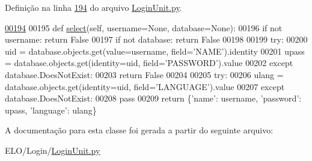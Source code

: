 Definição na linha \hyperlink{LoginUnit_8py_source_l00194}{194} do arquivo \hyperlink{LoginUnit_8py_source}{Login\-Unit.\-py}.


\begin{DoxyCode}
\hypertarget{classLogin_1_1LoginUnit_1_1PersLogin_l00194}{}\hyperlink{classLogin_1_1LoginUnit_1_1PersLogin_a1847dbd744377283add2327d2eb0b99f}{00194} 
00195     \textcolor{keyword}{def }\hyperlink{classLogin_1_1LoginUnit_1_1PersLogin_a1847dbd744377283add2327d2eb0b99f}{select}(self, username=None, database=None):
00196         \textcolor{keywordflow}{if} \textcolor{keywordflow}{not} username: \textcolor{keywordflow}{return} \textcolor{keyword}{False}
00197         \textcolor{keywordflow}{if} \textcolor{keywordflow}{not} database: \textcolor{keywordflow}{return} \textcolor{keyword}{False}
00198 
00199         \textcolor{keywordflow}{try}:
00200             uid = database.objects.get(value=username, field=\textcolor{stringliteral}{'NAME'}).identity
00201             upass = database.objects.get(identity=uid, field=\textcolor{stringliteral}{'PASSWORD'}).value
00202         \textcolor{keywordflow}{except} database.DoesNotExist:
00203             \textcolor{keywordflow}{return} \textcolor{keyword}{False}
00204 
00205         \textcolor{keywordflow}{try}:
00206             ulang = database.objects.get(identity=uid, field=\textcolor{stringliteral}{'LANGUAGE'}).value
00207         \textcolor{keywordflow}{except} database.DoesNotExist:
00208             \textcolor{keywordflow}{pass}
00209 
        \textcolor{keywordflow}{return} \{\textcolor{stringliteral}{'name'}: username, \textcolor{stringliteral}{'password'}: upass, \textcolor{stringliteral}{'language'}: ulang\}\end{DoxyCode}


A documentação para esta classe foi gerada a partir do seguinte arquivo\-:\begin{DoxyCompactItemize}
\item 
E\-L\-O/\-Login/\hyperlink{LoginUnit_8py}{Login\-Unit.\-py}\end{DoxyCompactItemize}
